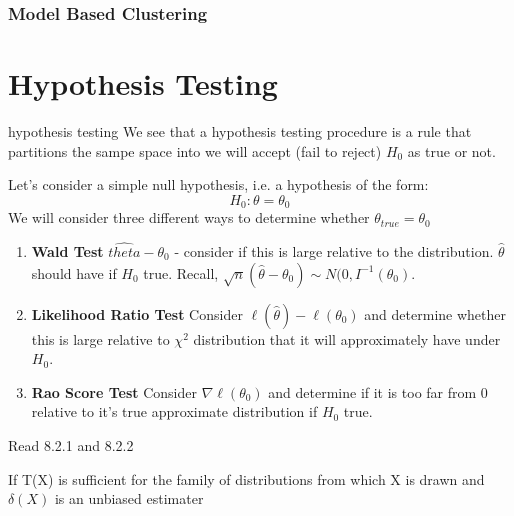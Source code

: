 \documentclass[11pt,fleqn]{book} %
\begin{document}
\subsection{Model Based Clustering}


\chapter{Hypothesis Testing}

\begin{definition}{hypothesis testing}
	We see that a hypothesis testing procedure is a rule that partitions the sampe space into we will accept (fail to reject) $H_0$ as true or not.
\end{definition}

Let's consider a simple null hypothesis, i.e. a hypothesis of the form:
$$H_0: \theta=\theta_0 $$
We will consider three different ways to determine whether $\theta_{true} = \theta_0$

\begin{enumerate}
	\item \textbf{Wald Test} $\hat{theta} - \theta_0$ - consider if this is large relative to the distribution. $\hat{\theta}$ should have if $H_0$ true. Recall, $\sqrt{n}(\hat{\theta}-\theta_0)\sim N(0,I^{-1}(\theta_0)$.
	\item \textbf{Likelihood Ratio Test} Consider $\ell(\hat{\theta}) - \ell(\theta_0)$ and determine whether this is large relative to $\chi^2$ distribution that it will approximately have under $H_0$. 
	\item \textbf{Rao Score Test} Consider $\nabla\ell(\theta_0)$ and determine if it is too far from 0 relative to it's true approximate distribution if $H_0$ true.  
\end{enumerate}

\begin{remark}
	Read 8.2.1 and 8.2.2
\end{remark}

\begin{theorem}
	If T(X) is sufficient for the family of distributions from which X is drawn and $\delta(X)$ is an unbiased estimater 
\end{theorem}
\end{document}
